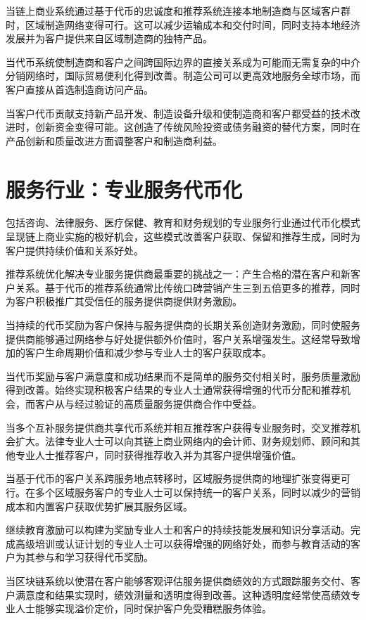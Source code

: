 \documentclass[
  Letterpaper,
]{scrbook}
\begin{document}
当链上商业系统通过基于代币的忠诚度和推荐系统连接本地制造商与区域客户群时，区域制造网络变得可行。这可以减少运输成本和交付时间，同时支持本地经济发展并为客户提供来自区域制造商的独特产品。

当代币系统使制造商和客户之间跨国际边界的直接关系成为可能而无需复杂的中介分销网络时，国际贸易便利化得到改善。制造公司可以更高效地服务全球市场，而客户直接从首选制造商访问产品。

当客户代币贡献支持新产品开发、制造设备升级和使制造商和客户都受益的技术改进时，创新资金变得可能。这创造了传统风险投资或债务融资的替代方案，同时在产品创新和质量改进方面调整客户和制造商利益。

\section{服务行业：专业服务代币化}\label{ux670dux52a1ux884cux4e1aux4e13ux4e1aux670dux52a1ux4ee3ux5e01ux5316}

包括咨询、法律服务、医疗保健、教育和财务规划的专业服务行业通过代币化模式呈现链上商业实施的极好机会，这些模式改善客户获取、保留和推荐生成，同时为客户提供持续价值和关系好处。

推荐系统优化解决专业服务提供商最重要的挑战之一：产生合格的潜在客户和新客户关系。基于代币的推荐系统通常比传统口碑营销产生三到五倍更多的推荐，同时为客户积极推广其受信任的服务提供商提供财务激励。

当持续的代币奖励为客户保持与服务提供商的长期关系创造财务激励，同时使服务提供商能够通过网络参与好处提供额外价值时，客户关系增强发生。这经常导致增加的客户生命周期价值和减少参与专业人士的客户获取成本。

当代币奖励与客户满意度和成功结果而不是简单的服务交付相关时，服务质量激励得到改善。始终实现积极客户结果的专业人士通常获得增强的代币分配和推荐机会，而客户从与经过验证的高质量服务提供商合作中受益。

当多个互补服务提供商共享代币系统并相互推荐客户获得专业服务时，交叉推荐机会扩大。法律专业人士可以向其链上商业网络内的会计师、财务规划师、顾问和其他专业人士推荐客户，同时获得推荐收入并为其客户提供增强价值。

当基于代币的客户关系跨服务地点转移时，区域服务提供商的地理扩张变得更可行。在多个区域服务客户的专业人士可以保持统一的客户关系，同时以减少的营销成本和内置客户获取优势扩展其服务区域。

继续教育激励可以构建为奖励专业人士和客户的持续技能发展和知识分享活动。完成高级培训或认证计划的专业人士可以获得增强的网络好处，而参与教育活动的客户为其参与和学习获得代币奖励。

当区块链系统以使潜在客户能够客观评估服务提供商绩效的方式跟踪服务交付、客户满意度和结果实现时，绩效测量和透明度得到改善。这种透明度经常使高绩效专业人士能够实现溢价定价，同时保护客户免受糟糕服务体验。
\end{document}

